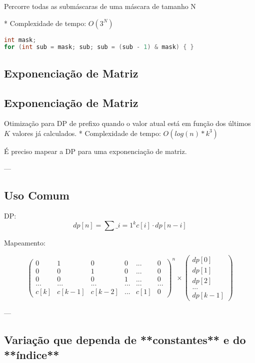 \documentclass[11pt, a4paper, twoside]{article}
\begin{document}
Percorre todas as submáscaras de uma máscara de tamanho N

* Complexidade de tempo: $O(3^N)$

\begin{multicols}{2}
\begin{lstlisting}[language=C++]
int mask;
for (int sub = mask; sub; sub = (sub - 1) & mask) { }
\end{lstlisting}
\end{multicols}

\subsection{Exponenciação de Matriz}

\subsection{Exponenciação de Matriz}



Otimização para DP de prefixo quando o valor atual está em função dos últimos $K$ valores já calculados.   
* Complexidade de tempo: $O(log(n)*k^3)$

É preciso mapear a DP para uma exponenciação de matriz.

---


\subsection{Uso Comum}


DP:   
$$ dp[n] = \sum\_{i=1}^{k} c[i] \cdot dp[n - i]$$ 

Mapeamento:   

$$ \begin{pmatrix} 0&1&0&0&...&0 \\ 0&0&1&0&...&0 \\ 0&0&0&1&...&0 \\ ...&...&...&...&...&... \\ c[k]&c[k-1]&c[k-2]&...&c[1]&0 \end{pmatrix}^n \times \begin{pmatrix} dp[0] \\ dp[1] \\ dp[2] \\ ... \\ dp[k-1] \end{pmatrix} $$

---
\subsection{Variação que dependa de **constantes** e do **índice**}
\end{document}
